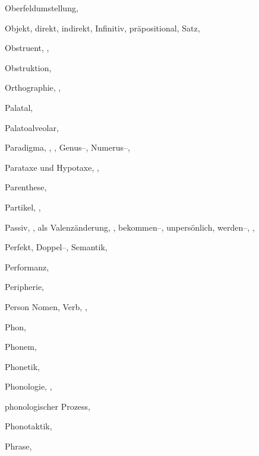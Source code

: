 \begin{theindex}
  \indexspace

  \item Oberfeldumstellung, 
  \item Objekt, 
    \subitem direkt, 
    \subitem indirekt, 
    \subitem Infinitiv, 
    \subitem präpositional, 
    \subitem Satz, 
  \item Obstruent, , 
  \item Obstruktion, 
  \item Orthographie, , 

  \indexspace

  \item Palatal, 
  \item Palatoalveolar, 
  \item Paradigma, , , 
    \subitem Genus--, 
    \subitem Numerus--, 
  \item Parataxe und Hypotaxe, , 
  \item Parenthese, 
  \item Partikel, , 
  \item Passiv, , 
    \subitem als Valenzänderung, , 
    \subitem bekommen--, 
    \subitem unpersönlich, 
    \subitem werden--, , 
  \item Perfekt, 
    \subitem Doppel--, 
    \subitem Semantik, 
  \item Performanz, 
  \item Peripherie, 
  \item Person
    \subitem Nomen, 
    \subitem Verb, , 
  \item Phon, 
  \item Phonem, 
  \item Phonetik, 
  \item Phonologie, , 
  \item phonologischer Prozess, 
  \item Phonotaktik, 
  \item Phrase, 

\end{theindex}

